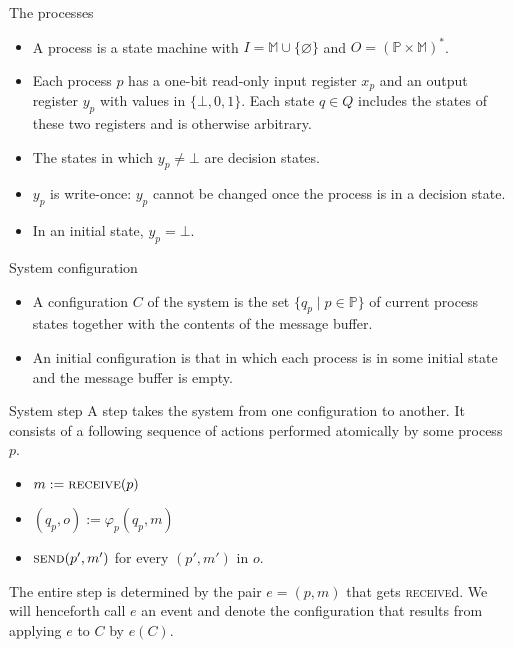 \documentclass{beamer}
\begin{document}
\begin{frame}{The processes}
  \begin{itemize}
    \item A process is a state machine with $I = \mathbb{M} \cup \{ \varnothing \}$ and $O = (\mathbb{P} \times \mathbb{M})^*$.
    \item Each process $p$ has a one-bit read-only \alert{input register} $x_p$ and an \alert{output register} $y_p$ with values in $\{ \bot, 0, 1\}$. Each state $q \in Q$ includes the states of these two registers and is otherwise arbitrary.
    \item The states in which $y_p \ne \bot$ are \alert{decision states}.
    \item $y_p$ is \alert{write-once}: $y_p$ cannot be changed once the process is in a decision state.
    \item In an \alert{initial state}, $y_p = \bot$.
  \end{itemize}
\end{frame}

\begin{frame}{System configuration}
  \begin{itemize}
    \item A configuration $C$ of the system is the set $\{ q_p \mid p \in \mathbb{P} \}$ of current process states together with the contents of the message buffer.
    \item An \alert{initial configuration} is that in which each process is in some initial state and the message buffer is empty.
  \end{itemize}
\end{frame}

\begin{frame}{System step}
  A step takes the system from one configuration to another. It consists of a following sequence of actions performed atomically by some process $p$.
  \begin{itemize}
    \item $m := \textsc{receive}(p)$
    \item $(q_p, o) := \varphi_p(q_p, m)$
    \item $\textsc{send}(p', m')$ for every $(p', m')$ in $o$.
  \end{itemize}
  The entire step is determined by the pair $e = (p, m)$ that gets \textsc{receive}d. We will henceforth call $e$ an \alert{event} and denote the configuration that results from applying $e$ to $C$ by $e(C)$.
\end{frame}
\end{document}

